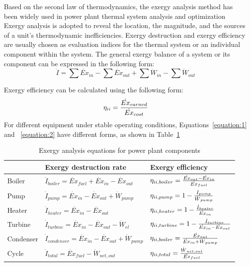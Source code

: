 \documentclass[preprint,12pt]{elsarticle}
\begin{document}
Based on the second law of thermodynamics, the exergy analysis method has been widely used in power plant thermal system analysis and optimization~\cite{Si2017Exergy,Yang2013Comprehensive,Ahmadi2016Energy}
Exergy analysis is adopted to reveal the location, the magnitude, and the sources of a unit's thermodynamic inefficiencies.
Exergy destruction and exergy efficiency are usually chosen as evaluation indices for the thermal system or an individual component within the system. 
The general exergy balance of a system or its component can be expressed in the following form:
\begin{equation}
\label{equation:1}
\dot{I}=\sum\dot{Ex}{}_{in}-\sum\dot{Ex}{}_{out}+\sum\dot{W}{}_{in}-\sum\dot{W}{}_{out}
\end{equation}





Exergy efficiency can be calculated using the following form:
\begin{equation}
\label{equation:2}
\eta_{\uppercase\expandafter{\romannumeral2}}=\frac{\dot{Ex}{}_{earned}}{\dot{Ex}{}_{cost}}
\end{equation}
For different equipment under stable operating conditions, Equations~\ref{equation:1} and ~\ref{equation:2} have different forms, as shown in Table~\ref{tab:exergy equation}~\cite{Aljundi2009Energy}

\begin{table}
\caption{Exergy analysis equations for power plant components}
\label{tab:exergy equation}
\centering
\begin{tabular}{lll}
\toprule 
 & Exergy destruction rate & Exergy efficiency\tabularnewline
\midrule
Boiler & $\dot{I}_{boiler}=\dot{Ex}{}_{fuel}+\dot{Ex}{}_{in}-\dot{Ex}{}_{out}$ & $\eta_{\uppercase\expandafter{\romannumeral2},boiler}=\frac{\dot{Ex}{}_{out}-\dot{Ex}{}_{in}}{\dot{Ex}{}_{fuel}}$\tabularnewline
Pump & $\dot{I}_{pump}=\dot{Ex}{}_{in}-\dot{Ex}{}_{out}+\dot{W}{}_{pump}$ & $\eta_{\uppercase\expandafter{\romannumeral2},pump}=1-\frac{\dot{I}_{pump}}{\dot{W}{}_{pump}}$\tabularnewline
Heater & $\dot{I}_{heater}=\dot{Ex}{}_{in}-\dot{Ex}{}_{out}$ & $\eta_{\uppercase\expandafter{\romannumeral2},heater}=1-\frac{\dot{I}_{heater}}{\dot{Ex}{}_{in}}$\tabularnewline
Turbine & $\dot{I}_{turbine}=\dot{Ex}{}_{in}-\dot{Ex}{}_{out}-\dot{W}{}_{el}$ & $\eta_{\uppercase\expandafter{\romannumeral2},turbine}=1-\frac{\dot{I}_{turbine}}{\dot{Ex}{}_{in}-\dot{Ex}{}_{out}}$\tabularnewline
Condenser & $\dot{I}_{condenser}=\dot{Ex}{}_{in}-\dot{Ex}{}_{out}+\dot{W}{}_{pump}$ & $\eta_{\uppercase\expandafter{\romannumeral2},boiler}=\frac{\dot{Ex}{}_{out}}{\dot{Ex}{}_{in}+\dot{W}{}_{pump}}$\tabularnewline
Cycle &$\dot{I}_{total}=\dot{Ex}{}_{fuel}-\dot{W}{}_{net,out}$ & $\eta_{\uppercase\expandafter{\romannumeral2},total}=\frac{\dot{W}{}_{net,out}}{\dot{Ex}{}_{fuel}}$\tabularnewline
\bottomrule
\end{tabular}
\end{table}
\end{document}
